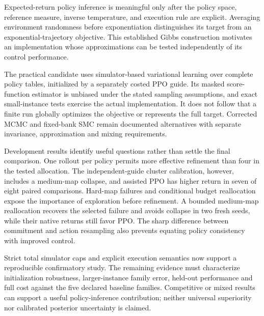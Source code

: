 \label{sec:conclusion}

Expected-return policy inference is meaningful only after the policy space,
reference measure, inverse temperature, and execution rule are explicit.
Averaging environment randomness before exponentiation distinguishes its
target from an exponential-trajectory objective. This established Gibbs
construction motivates an implementation whose approximations can be
tested independently of its control performance.

The practical candidate uses simulator-based variational learning over
complete policy tables, initialized by a separately costed PPO guide.
Its masked score-function estimator is unbiased under the stated sampling
assumptions, and exact small-instance tests exercise the actual implementation.
It does not follow that a finite run globally optimizes the objective or
represents the full target. Corrected MCMC and fixed-bank SMC remain
documented alternatives with separate invariance, approximation and mixing
requirements.

Development results identify useful questions rather than settle the final
comparison. One rollout per policy permits more effective refinement than
four in the tested allocation. The independent-guide cluster calibration,
however, includes a medium-map collapse, and assisted PPO has higher return
in seven of eight paired comparisons. Hard-map failures and conditional
budget reallocation expose the importance of exploration before refinement.
A bounded medium-map reallocation recovers the selected failure and avoids
collapse in two fresh seeds, while their native returns still favor PPO.
The sharp difference between commitment and action resampling also prevents
equating policy consistency with improved control.

Strict total simulator caps and explicit execution semantics now support
a reproducible confirmatory study. The remaining evidence must characterize
initialization robustness, larger-instance family error, held-out performance
and full cost against the five declared baseline families. Competitive or mixed
results can support a useful policy-inference contribution; neither
universal superiority nor calibrated posterior uncertainty is claimed.
